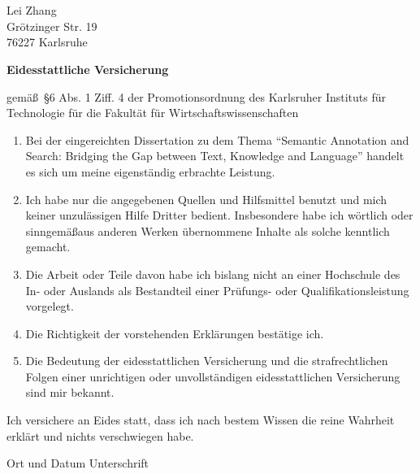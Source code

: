 \cleardoublepage
\section*{}
\thispagestyle{plain}
\vspace{-3cm}
\begin{flushright}
  \noindent
  Lei Zhang\\
  Gr\"otzinger Str. 19\\
  76227 Karlsruhe\\
\end{flushright}

\vspace{0.5cm}

\begin{center}
\textbf{\Large{Eidesstattliche Versicherung}}
\vspace{0.5cm}

\noindent
gem\"a\ss~\S 6 Abs. 1 Ziff. 4 der Promotionsordnung des Karlsruher
Instituts f\"ur Technologie f\"ur die Fakult\"at f\"ur
Wirtschaftswissenschaften
\end{center}

\begin{enumerate}
\item Bei der eingereichten Dissertation zu dem Thema ``Semantic Annotation and Search: Bridging the Gap between Text, Knowledge and Language''
  handelt es sich um meine eigenst\"andig erbrachte Leistung.
\item Ich habe nur die angegebenen Quellen und Hilfsmittel benutzt und
  mich keiner unzul\"assigen Hilfe Dritter bedient. Insbesondere habe
  ich w\"ortlich oder sinngem\"a\ss aus anderen Werken \"ubernommene Inhalte
  als solche kenntlich gemacht.
\item Die Arbeit oder Teile davon habe ich bislang nicht an einer
  Hochschule des In- oder Auslands als Bestandteil einer Pr\"ufungs-
  oder Qualifikationsleistung vorgelegt.
\item Die Richtigkeit der vorstehenden Erkl\"arungen best\"atige ich.
\item Die Bedeutung der eidesstattlichen Versicherung und die
  strafrechtlichen Folgen einer unrichtigen oder unvollst\"andigen
  eidesstattlichen Versicherung sind mir bekannt.
\end{enumerate}

\noindent
Ich versichere an Eides statt, dass ich nach bestem Wissen die reine
Wahrheit erkl\"art und nichts verschwiegen habe.

\vspace{1cm}


\noindent Ort und Datum \hspace{5cm} Unterschrift